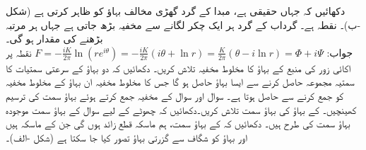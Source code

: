 \quad {}\quad
دکھائیں کہ  جہاں  حقیقی ہے، مبدا کے گرد گھڑی مخالف  بہاؤ کو ظاہر کرتی ہے (شکل -ب)۔  نقطہ   ہے۔ گرداب کے گرد ہر ایک چکر لگانے سے مخفیہ بڑھ جاتی ہے جہاں ہر مرتبہ  بڑھنے کی مقدار  ہو گی۔\\
جواب:\quad
$F=-\tfrac{iK}{2\pi}\ln (re^{i\theta})=-\tfrac{iK}{2\pi}(i\theta+\ln r)=\tfrac{K}{2\pi}(\theta-i\ln r)=\Phi+i\Psi$
\quad
نقطہ  پر اکائی زور کی منبع کے بہاؤ کا مخلوط مخفیہ تلاش کریں۔
\quad
دکھائیں کہ دو بہاؤ کے سرعتی سمتیات کا سمتیہ مجموعہ حاصل کرنے سے  ایسا بہاؤ حاصل ہو گا جس کا مخلوط مخفیہ ان بہاؤ کے مخلوط مخفیہ کو جمع کرنے سے حاصل ہوتا ہے۔ 
\quad
سوال  اور سوال  کے مخفیہ جمع کرتے ہوئے بہاؤ سمت کی ترسیم کھینچیں۔
\quad
{} کے بہاؤ کی بہاؤ سمت تلاش کریں۔دکھائیں کہ چھوٹے  کے لیے  سوال  کے بہاؤ سمت موجودہ بہاؤ سمت کی طرح ہیں۔
\quad
دکھائیں کہ  کے بہاؤ سمت،  ہم ماسکہ قطع زائد  ہوں گی جن کے ماسکہ  ہیں اور بہاؤ کو شگاف سے گزرتی بہاؤ تصور کیا جا سکتا ہے (شکل -الف)۔
